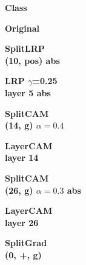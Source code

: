 \begin{figure}[H]
    \centering

    \begin{minipage}[c]{0.08\linewidth}
        \centering
        \scriptsize \textbf{Class}
    \end{minipage}\hspace{0.002\linewidth}%
    \begin{minipage}[c]{0.10\linewidth}
        \centering
        \scriptsize \textbf{Original}
    \end{minipage}\hspace{0.002\linewidth}%
    \begin{minipage}[c]{0.10\linewidth}
        \centering
        \scriptsize \textbf{SplitLRP}\\
        \scriptsize \textbf{(10, pos) abs}
    \end{minipage}\hspace{0.002\linewidth}%
    \begin{minipage}[c]{0.10\linewidth}
        \centering
        \scriptsize \textbf{LRP $\gamma$=0.25}\\
        \scriptsize \textbf{layer 5 abs}
    \end{minipage}\hspace{0.002\linewidth}%
    \begin{minipage}[c]{0.10\linewidth}
        \centering
        \scriptsize \textbf{SplitCAM}\\
        \scriptsize \textbf{(14, g) $\alpha=0.4$}
    \end{minipage}\hspace{0.002\linewidth}%
    \begin{minipage}[c]{0.10\linewidth}
        \centering
        \scriptsize \textbf{LayerCAM}\\
        \scriptsize \textbf{layer 14}
    \end{minipage}\hspace{0.002\linewidth}%
    \begin{minipage}[c]{0.10\linewidth}
        \centering
        \scriptsize \textbf{SplitCAM}\\
        \scriptsize \textbf{(26, g) $\alpha=0.3$ abs}
    \end{minipage}\hspace{0.002\linewidth}%
    \begin{minipage}[c]{0.10\linewidth}
        \centering
        \scriptsize \textbf{LayerCAM}\\
        \scriptsize \textbf{layer 26}
    \end{minipage}\hspace{0.002\linewidth}%
    \begin{minipage}[c]{0.10\linewidth}
        \centering
        \scriptsize \textbf{SplitGrad}\\
        \scriptsize \textbf{(0, +, g)}
    \end{minipage}


\end{figure}
